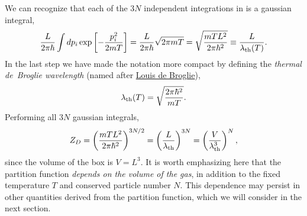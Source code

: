 We can recognize that each of the $3N$ independent integrations in  is a gaussian integral,
\begin{equation*}
  \frac{L}{2\pi\hbar} \int dp_i \exp\left[-\frac{p_i^2}{2mT}\right] = \frac{L}{2\pi\hbar} \sqrt{2\pi mT} = \sqrt{\frac{mTL^2}{2\pi\hbar^2}} \equiv \frac{L}{\lambda_{\mathrm{th}}(T)}.
\end{equation*}
In the last step we have made the notation more compact by defining the \textit{thermal de~Broglie wavelength} (named after \href{https://en.wikipedia.org/wiki/Louis_de_Broglie}{Louis de Broglie}),
\begin{equation}
  \lambda_{\mathrm{th}}(T) = \sqrt{\frac{2\pi\hbar^2}{mT}}.
\end{equation}
Performing all $3N$ gaussian integrals,
\begin{equation}
  \label{eq:ideal_dist}
  Z_D = \left(\frac{mTL^2}{2\pi\hbar^2}\right)^{3N / 2} = \left(\frac{L}{\lambda_{\mathrm{th}}}\right)^{3N} = \left(\frac{V}{\lambda_{\mathrm{th}}^3}\right)^N,
\end{equation}
since the volume of the box is $V = L^3$.
It is worth emphasizing here that the partition function \emph{depends on the volume of the gas}, in addition to the fixed temperature $T$ and conserved particle number $N$.
This dependence may persist in other quantities derived from the partition function, which we will consider in the next section.

